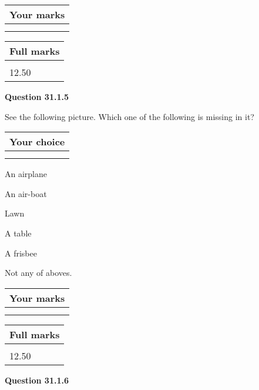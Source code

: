\documentclass[12pt]{article}
\begin{document}
 
\vspace{0.3in}
  
\vspace{0.2in}
  
         \begin{tabular}{|l|}
\hline
 Your marks  \\
\hline
 \\ 
 \\ 
\hline
\end{tabular}
\hspace{0.05in} \begin{tabular}{|l|}
\hline
 Full marks  \\
\hline
 \\ 
12.50 \\
\hline
\end{tabular}
{\textbf{\Large{Question
31.1.5 
}}}
  
  
See the following picture.
Which one of the following is missing in it?
  
  
\noindent\hspace{3.0in} \begin{tabular}{|l|}
\hline
Your choice \\
\hline
 \\ 
 \\ 
\hline
\end{tabular}
  
  
 
 
An airplane
 
 
An air-boat
 
 
Lawn
 
 
A table
 
 
A frisbee
 
 
  Not any of aboves.
 
 
 
\vspace{0.3in}
  
\vspace{0.2in}
  
         \begin{tabular}{|l|}
\hline
 Your marks  \\
\hline
 \\ 
 \\ 
\hline
\end{tabular}
\hspace{0.05in} \begin{tabular}{|l|}
\hline
 Full marks  \\
\hline
 \\ 
12.50 \\
\hline
\end{tabular}
{\textbf{\Large{Question
31.1.6 
}}}
  
\end{document}

